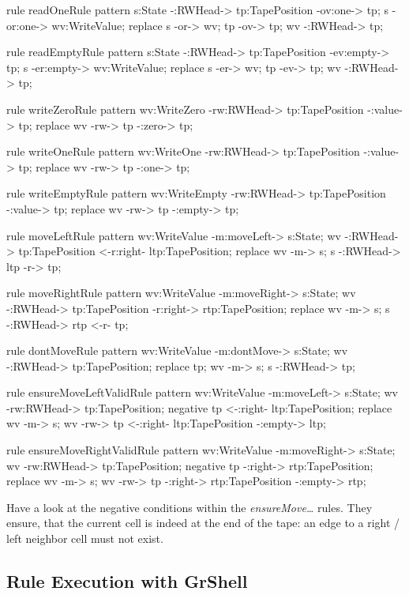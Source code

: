 \begin{grgen}[firstnumber=last] 
rule readOneRule {
	pattern {
		s:State -:RWHead-> tp:TapePosition -ov:one-> tp;
		s -or:one-> wv:WriteValue;
	}
	replace {
		s -or-> wv;
		tp -ov-> tp;
		wv -:RWHead-> tp;
	}
}

rule readEmptyRule {
	pattern {
		s:State -:RWHead-> tp:TapePosition -ev:empty-> tp;
		s -er:empty-> wv:WriteValue;
	}
	replace {
		s -er-> wv;
		tp -ev-> tp;
		wv -:RWHead-> tp;
	}
}

rule writeZeroRule {
	pattern {
		wv:WriteZero -rw:RWHead-> tp:TapePosition -:value-> tp;
	}
	replace {
		wv -rw-> tp -:zero-> tp;
	}	
}

rule writeOneRule {
	pattern {
		wv:WriteOne -rw:RWHead-> tp:TapePosition -:value-> tp;
	}
	replace {
		wv -rw-> tp -:one-> tp;
	}	
}

rule writeEmptyRule {
	pattern {
		wv:WriteEmpty -rw:RWHead-> tp:TapePosition -:value-> tp;
	}
	replace {
		wv -rw-> tp -:empty-> tp;
	}	
}

rule moveLeftRule {
	pattern {
		wv:WriteValue -m:moveLeft-> s:State;
		wv -:RWHead-> tp:TapePosition <-r:right- ltp:TapePosition;
	}
	replace {
		wv -m-> s;
		s -:RWHead-> ltp -r-> tp;
	}
}

rule moveRightRule {
	pattern {
		wv:WriteValue -m:moveRight-> s:State;
		wv -:RWHead-> tp:TapePosition -r:right-> rtp:TapePosition;
	}
	replace {
		wv -m-> s;
		s -:RWHead-> rtp <-r- tp;
	}
}

rule dontMoveRule {
	pattern {
		wv:WriteValue -m:dontMove-> s:State;
		wv -:RWHead-> tp:TapePosition;
	}
	replace {
		tp;
		wv -m-> s;
		s -:RWHead-> tp;
	}
}

rule ensureMoveLeftValidRule {
	pattern {
		wv:WriteValue -m:moveLeft-> s:State;
		wv -rw:RWHead-> tp:TapePosition;
		negative {
			tp <-:right- ltp:TapePosition;
		}
	}
	replace {
		wv -m-> s;
		wv -rw-> tp <-:right- ltp:TapePosition -:empty-> ltp;
	}
}

rule ensureMoveRightValidRule {
	pattern {
		wv:WriteValue -m:moveRight-> s:State;
		wv -rw:RWHead-> tp:TapePosition;
		negative {
			tp -:right-> rtp:TapePosition;
		}
	}
	replace {
		wv -m-> s;
		wv -rw-> tp -:right-> rtp:TapePosition -:empty-> rtp;
	}
}
\end{grgen}
Have a look at the negative conditions within the \emph{ensureMove\dots} rules. They ensure, that the current cell is indeed at the end of the tape: an edge to a right / left neighbor cell must not exist.

\subsection{Rule Execution with GrShell}

